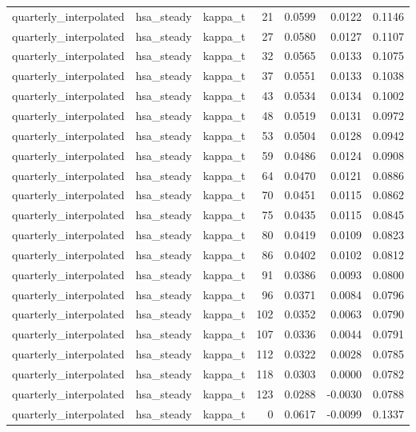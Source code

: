 \begin{tabular}{lllrrrr}
quarterly\_interpolated & hsa\_steady & kappa\_t & 21 & 0.0599 & 0.0122 & 0.1146 \\
quarterly\_interpolated & hsa\_steady & kappa\_t & 27 & 0.0580 & 0.0127 & 0.1107 \\
quarterly\_interpolated & hsa\_steady & kappa\_t & 32 & 0.0565 & 0.0133 & 0.1075 \\
quarterly\_interpolated & hsa\_steady & kappa\_t & 37 & 0.0551 & 0.0133 & 0.1038 \\
quarterly\_interpolated & hsa\_steady & kappa\_t & 43 & 0.0534 & 0.0134 & 0.1002 \\
quarterly\_interpolated & hsa\_steady & kappa\_t & 48 & 0.0519 & 0.0131 & 0.0972 \\
quarterly\_interpolated & hsa\_steady & kappa\_t & 53 & 0.0504 & 0.0128 & 0.0942 \\
quarterly\_interpolated & hsa\_steady & kappa\_t & 59 & 0.0486 & 0.0124 & 0.0908 \\
quarterly\_interpolated & hsa\_steady & kappa\_t & 64 & 0.0470 & 0.0121 & 0.0886 \\
quarterly\_interpolated & hsa\_steady & kappa\_t & 70 & 0.0451 & 0.0115 & 0.0862 \\
quarterly\_interpolated & hsa\_steady & kappa\_t & 75 & 0.0435 & 0.0115 & 0.0845 \\
quarterly\_interpolated & hsa\_steady & kappa\_t & 80 & 0.0419 & 0.0109 & 0.0823 \\
quarterly\_interpolated & hsa\_steady & kappa\_t & 86 & 0.0402 & 0.0102 & 0.0812 \\
quarterly\_interpolated & hsa\_steady & kappa\_t & 91 & 0.0386 & 0.0093 & 0.0800 \\
quarterly\_interpolated & hsa\_steady & kappa\_t & 96 & 0.0371 & 0.0084 & 0.0796 \\
quarterly\_interpolated & hsa\_steady & kappa\_t & 102 & 0.0352 & 0.0063 & 0.0790 \\
quarterly\_interpolated & hsa\_steady & kappa\_t & 107 & 0.0336 & 0.0044 & 0.0791 \\
quarterly\_interpolated & hsa\_steady & kappa\_t & 112 & 0.0322 & 0.0028 & 0.0785 \\
quarterly\_interpolated & hsa\_steady & kappa\_t & 118 & 0.0303 & 0.0000 & 0.0782 \\
quarterly\_interpolated & hsa\_steady & kappa\_t & 123 & 0.0288 & -0.0030 & 0.0788 \\
quarterly\_interpolated & hsa\_steady & kappa\_t & 0 & 0.0617 & -0.0099 & 0.1337 \\

\end{tabular}
